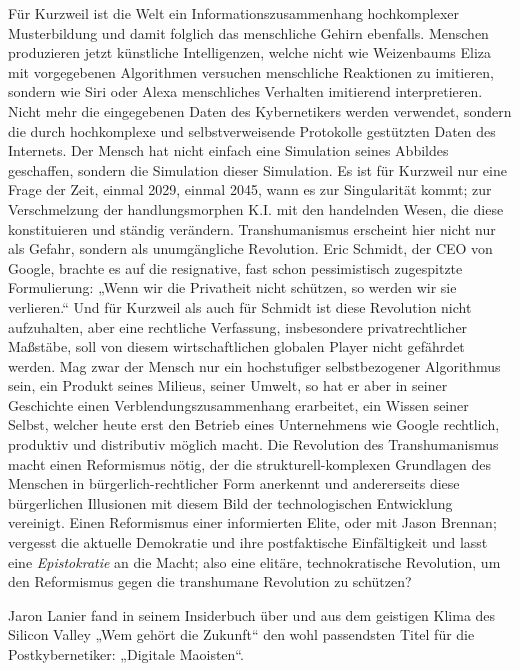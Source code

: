 \documentclass[a4paper,11pt]{article}
\begin{document}
Für Kurzweil ist die Welt ein Informationszusammenhang hochkomplexer
Musterbildung und damit folglich das menschliche Gehirn ebenfalls. Menschen
produzieren jetzt künstliche Intelligenzen, welche nicht wie Weizenbaums Eliza
mit vorgegebenen Algorithmen versuchen menschliche Reaktionen zu imitieren,
sondern wie Siri oder Alexa menschliches Verhalten imitierend
interpretieren. Nicht mehr die eingegebenen Daten des Kybernetikers werden
verwendet, sondern die durch hochkomplexe und selbstverweisende Protokolle
gestützten Daten des Internets. Der Mensch hat nicht einfach eine Simulation
seines Abbildes geschaffen, sondern die Simulation dieser Simulation. Es ist
für Kurzweil nur eine Frage der Zeit, einmal 2029, einmal 2045, wann es zur
Singularität kommt; zur Verschmelzung der handlungsmorphen K.I. mit den
handelnden Wesen, die diese konstituieren und ständig
verändern. Transhumanismus erscheint hier nicht nur als Gefahr, sondern als
unumgängliche Revolution. Eric Schmidt, der CEO von Google, brachte es auf die
resignative, fast schon pessimistisch zugespitzte Formulierung: „Wenn wir die
Privatheit nicht schützen, so werden wir sie verlieren.“ Und für Kurzweil als
auch für Schmidt ist diese Revolution nicht aufzuhalten, aber eine rechtliche
Verfassung, insbesondere privatrechtlicher Maßstäbe, soll von diesem
wirtschaftlichen globalen Player nicht gefährdet werden. Mag zwar der Mensch
nur ein hochstufiger selbstbezogener Algorithmus sein, ein Produkt seines
Milieus, seiner Umwelt, so hat er aber in seiner Geschichte einen
Verblendungszusammenhang erarbeitet, ein Wissen seiner Selbst, welcher heute
erst den Betrieb eines Unternehmens wie Google rechtlich, produktiv und
distributiv möglich macht. Die Revolution des Transhumanismus macht einen
Reformismus nötig, der die strukturell-komplexen Grundlagen des Menschen in
bürgerlich-rechtlicher Form anerkennt und andererseits diese bürgerlichen
Illusionen mit diesem Bild der technologischen Entwicklung vereinigt. Einen
Reformismus einer informierten Elite, oder mit Jason Brennan; vergesst die
aktuelle Demokratie und ihre postfaktische Einfältigkeit und lasst eine
\emph{Epistokratie} an die Macht; also eine elitäre, technokratische
Revolution, um den Reformismus gegen die transhumane Revolution zu schützen?

Jaron Lanier fand in seinem Insiderbuch über und aus dem geistigen Klima des
Silicon Valley „Wem gehört die Zukunft“ den wohl passendsten Titel für die
Postkybernetiker: „Digitale Maoisten“.
\end{document}
